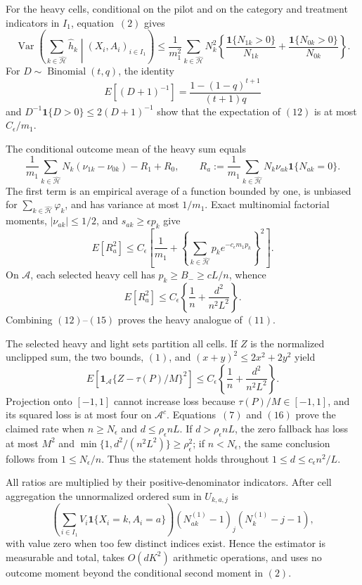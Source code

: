 For the heavy cells, conditional on the pilot and on the category and treatment indicators in \(I_1\), equation~\((2)\) gives
\[
 \operatorname{Var}\left(\sum_{k\in\widehat{\mathcal H}}\widehat h_k
 \middle|(X_i,A_i)_{i\in I_1}\right)
 \le\frac1{m_1^2}\sum_{k\in\widehat{\mathcal H}}N_k^2
 \left\{\frac{\mathbf1\{N_{1k}>0\}}{N_{1k}}+
 \frac{\mathbf1\{N_{0k}>0\}}{N_{0k}}\right\}.
\tag{12}
\]
For \(D\sim\operatorname{Binomial}(t,q)\), the identity
\[
 E[(D+1)^{-1}]=\frac{1-(1-q)^{t+1}}{(t+1)q}
\]
and \(D^{-1}\mathbf1\{D>0\}\le2(D+1)^{-1}\) show that the expectation of \((12)\) is at most \(C_{\epsilon}/m_1\).

The conditional outcome mean of the heavy sum equals
\[
 \frac1{m_1}\sum_{k\in\widehat{\mathcal H}}N_k(\nu_{1k}-\nu_{0k})-R_1+R_0,
 \qquad
 R_a:=\frac1{m_1}\sum_{k\in\widehat{\mathcal H}}N_k\nu_{ak}\mathbf1\{N_{ak}=0\}.
\tag{13}
\]
The first term is an empirical average of a function bounded by one, is unbiased for \(\sum_{k\in\widehat{\mathcal H}}\varphi_k\), and has variance at most \(1/m_1\).  Exact multinomial factorial moments, \(|\nu_{ak}|\le1/2\), and \(s_{ak}\ge\epsilon p_k\) give
\[
 E[R_a^2]\le C_{\epsilon}\left[\frac1{m_1}+
 \left\{\sum_{k\in\widehat{\mathcal H}}p_ke^{-c_{\epsilon}m_1p_k}\right\}^2\right].
\tag{14}
\]
On \(\mathcal A\), each selected heavy cell has \(p_k\ge B_-\ge cL/n\), whence
\[
 E[R_a^2]\le C_{\epsilon}\left\{\frac1n+\frac{d^2}{n^2L^2}\right\}.
\tag{15}
\]
Combining \((12)\)--\((15)\) proves the heavy analogue of \((11)\).

The selected heavy and light sets partition all cells.  If \(Z\) is the normalized unclipped sum, the two bounds, \((1)\), and \((x+y)^2\le2x^2+2y^2\) yield
\[
 E[\mathbf1_{\mathcal A}\{Z-\tau(P)/M\}^2]
 \le C_{\epsilon}\left\{\frac1n+\frac{d^2}{n^2L^2}\right\}.
\tag{16}
\]
Projection onto \([-1,1]\) cannot increase loss because \(\tau(P)/M\in[-1,1]\), and its squared loss is at most four on \(\mathcal A^c\).  Equations~\((7)\) and \((16)\) prove the claimed rate when \(n\ge N_{\epsilon}\) and \(d\le\rho_{\epsilon}nL\).  If \(d>\rho_{\epsilon}nL\), the zero fallback has loss at most \(M^2\) and \(\min\{1,d^2/(n^2L^2)\}\ge\rho_{\epsilon}^2\); if \(n<N_{\epsilon}\), the same conclusion follows from \(1\le N_{\epsilon}/n\).  Thus the statement holds throughout \(1\le d\le c_{\epsilon}n^2/L\).

All ratios are multiplied by their positive-denominator indicators.  After cell aggregation the unnormalized ordered sum in \(U_{k,a,j}\) is
\[
 \left(\sum_{i\in I_1}V_i\mathbf1\{X_i=k,A_i=a\}\right)
 (N_{ak}^{(1)}-1)_j(N_k^{(1)}-j-1),
\]
with value zero when too few distinct indices exist.  Hence the estimator is measurable and total, takes \(O(dK^2)\) arithmetic operations, and uses no outcome moment beyond the conditional second moment in \((2)\).